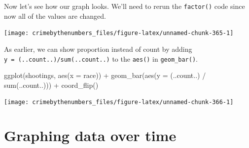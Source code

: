 \documentclass[
  a4paper,
]{krantz}
\makeatletter
\newenvironment{Shaded}{\begin{snugshade}}{\end{snugshade}}
\newcommand{\AttributeTok}[1]{\textcolor[rgb]{0.77,0.63,0.00}{#1}}
\newcommand{\ConstantTok}[1]{\textcolor[rgb]{0.00,0.00,0.00}{#1}}
\newcommand{\FunctionTok}[1]{\textcolor[rgb]{0.00,0.00,0.00}{#1}}
\newcommand{\NormalTok}[1]{#1}
\newcommand{\OtherTok}[1]{\textcolor[rgb]{0.56,0.35,0.01}{#1}}
\newcommand{\SpecialCharTok}[1]{\textcolor[rgb]{0.00,0.00,0.00}{#1}}
\newenvironment{kframe}{%
\medskip{}
\setlength{\fboxsep}{.8em}
 \def\at@end@of@kframe{}%
 \ifinner\ifhmode%
  \def\at@end@of@kframe{\end{minipage}}%
  \begin{minipage}{\columnwidth}%
 \fi\fi%
 \def\FrameCommand##1{\hskip\@totalleftmargin \hskip-\fboxsep
 \colorbox{shadecolor}{##1}\hskip-\fboxsep
     \hskip-\linewidth \hskip-\@totalleftmargin \hskip\columnwidth}%
 \MakeFramed {\advance\hsize-\width
   \@totalleftmargin\z@ \linewidth\hsize
   \@setminipage}}%
 {\par\unskip\endMakeFramed%
 \at@end@of@kframe}
\renewenvironment{Shaded}{\begin{kframe}}{\end{kframe}}
\makeatother
\begin{document}
Now let's see how our graph looks. We'll need to rerun the
\texttt{factor()} code since now all of the values are
changed.

\begin{Shaded}
\end{Shaded}

\begin{center}\texttt{[image: crimebythenumbers\_files/figure-latex/unnamed-chunk-365-1]} \end{center}

As earlier, we can show proportion instead of count by
adding \texttt{y\ =\ (..count..)/sum(..count..)} to the
\texttt{aes()} in \texttt{geom\_bar()}.

\begin{Shaded}
\begin{Highlighting}[]
\FunctionTok{ggplot}\NormalTok{(shootings, }\FunctionTok{aes}\NormalTok{(}\AttributeTok{x =}\NormalTok{ race)) }\SpecialCharTok{+}
  \FunctionTok{geom\_bar}\NormalTok{(}\FunctionTok{aes}\NormalTok{(}\AttributeTok{y =}\NormalTok{ (..count..) }\SpecialCharTok{/} \FunctionTok{sum}\NormalTok{(..count..))) }\SpecialCharTok{+}
  \FunctionTok{coord\_flip}\NormalTok{()}
\end{Highlighting}
\end{Shaded}

\begin{center}\texttt{[image: crimebythenumbers\_files/figure-latex/unnamed-chunk-366-1]} \end{center}

\hypertarget{graphing-data-over-time}{%
\section{Graphing data over
time}\label{graphing-data-over-time}}
\end{document}
